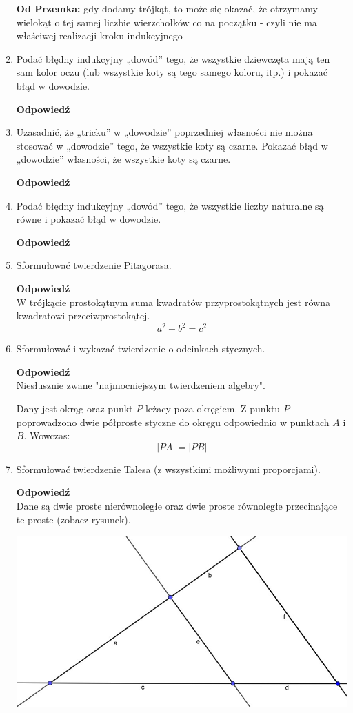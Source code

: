 \documentclass[12pt,a4paper]{article}
\newcounter{twierdzenie}
\theoremstyle{break}
\newcommand{\Odp}[1]{
		\begin{mdframed}[style=zadanie]
			\textbf{Odpowiedź}\\
			#1
		\end{mdframed}
	}
\begin{document}
\begin{enumerate}[1.]
{		\textbf{Od Przemka:} gdy dodamy trójkąt, to może się okazać, że otrzymamy wielokąt o tej samej liczbie wierzchołków co na początku - czyli nie ma właściwej realizacji kroku indukcyjnego
		
	}
	
	\item Podać błędny indukcyjny „dowód” tego, że wszystkie dziewczęta mają ten sam kolor oczu (lub wszystkie koty są tego samego koloru, itp.) i pokazać błąd w dowodzie.
	\Odp{
		
	}
	
	\item Uzasadnić, że „tricku” w „dowodzie” poprzedniej własności nie można stosować w „dowodzie” tego, że wszystkie koty są czarne. Pokazać błąd w „dowodzie” własności, że wszystkie koty są czarne.
	\Odp{
		
	}
	
	\item Podać błędny indukcyjny „dowód” tego, że wszystkie liczby naturalne są równe i pokazać błąd w dowodzie.
	\Odp{
		
	}
	
	\item Sformułować twierdzenie Pitagorasa.
	\Odp{
		W trójkącie prostokątnym suma kwadratów przyprostokątnych jest równa kwadratowi przeciwprostokątej.
		$$a^2+b^2=c^2$$
	}
	
	\item Sformułować i wykazać twierdzenie o odcinkach stycznych.
	\Odp{
		Niesłusznie zwane "najmocniejszym twierdzeniem algebry".
		
		Dany jest okrąg oraz punkt $P$ leżacy poza okręgiem. Z punktu $P$ poprowadzono dwie półproste styczne do okręgu odpowiednio w punktach $A$ i $B$. Wowczas:	$$|PA|=|PB|$$
		
	}
	
	\item Sformułować twierdzenie Talesa (z wszystkimi możliwymi proporcjami).
	\Odp{
		Dane są dwie proste nierównoległe oraz dwie proste równoległe przecinające te proste (zobacz rysunek).
		
		\includegraphics[width=\linewidth]{tales.jpeg}
		
}
\end{enumerate}
\end{document}
